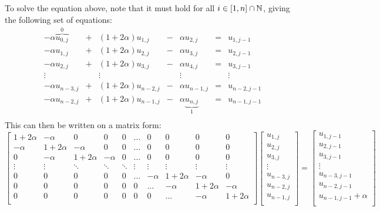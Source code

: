 \documentclass[12pt,english,a4paper]{article}
\begin{document}
To solve the equation above, note that it must hold for all \(i\in\qty[1,n]\cap\mathbb{N}\), giving the following set of equations:
\[
    \begin{array}{ccccccc}
        -\alpha \overbrace{u_{0,j}}^0 &+& (1+2\alpha)u_{1,j} &-& \alpha u_{2,j} &=& u_{1,j-1}\\
        -\alpha u_{1,j} &+& (1+2\alpha)u_{2,j} &-& \alpha u_{3,j} &=& u_{2,j-1}\\
        -\alpha u_{2,j} &+& (1+2\alpha)u_{3,j} &-& \alpha u_{4,j} &=& u_{3,j-1}\\
        \vdots && \vdots && \vdots && \vdots\\
        -\alpha u_{n-3,j} &+& (1+2\alpha)u_{n-2,j} &-& \alpha u_{n-1,j} &=& u_{n-2,j-1}\\
        -\alpha u_{n-2,j} &+& (1+2\alpha)u_{n-1,j} &-& \alpha \underbrace{u_{n,j}}_1 &=& u_{n-1,j-1}\\
    \end{array}
\]
This can then be written on a matrix form:
\[
    \begin{bmatrix}
        1 + 2\alpha & -\alpha & 0 & 0 & 0 & \dots & 0 & 0 & 0 & 0  \\
        -\alpha & 1+2\alpha & -\alpha & 0 & 0 & \dots & 0 & 0 & 0 & 0  \\
        0 & -\alpha & 1+2\alpha & -\alpha & 0 & \dots & 0 & 0 & 0 & 0 \\
        \vdots & \vdots &  \ddots & \ddots & \ddots & \vdots & \vdots & \vdots & \vdots & \vdots\\
        0 & 0 & 0 & 0 & 0 & \dots & -\alpha & 1+2\alpha & - \alpha & 0\\
        0 & 0 & 0 & 0 & 0 & 0 & \dots & -\alpha & 1+2\alpha & - \alpha\\
        0 & 0 & 0 & 0 & 0 & 0 & 0 & \dots & -\alpha & 1+2\alpha\\
    \end{bmatrix}
    \begin{bmatrix}
        u_{1,j}\\
        u_{2,j}\\
        u_{3,j}\\
        \vdots\\
        u_{n-3,j}\\
        u_{n-2,j}\\
        u_{n-1,j}\\
    \end{bmatrix}
    =
    \begin{bmatrix}
        u_{1,j-1}\\
        u_{2,j-1}\\
        u_{3,j-1}\\
        \vdots\\
        u_{n-3,j-1}\\
        u_{n-2,j-1}\\
        u_{n-1,j-1} + \alpha\\
    \end{bmatrix}
\]
\end{document}
